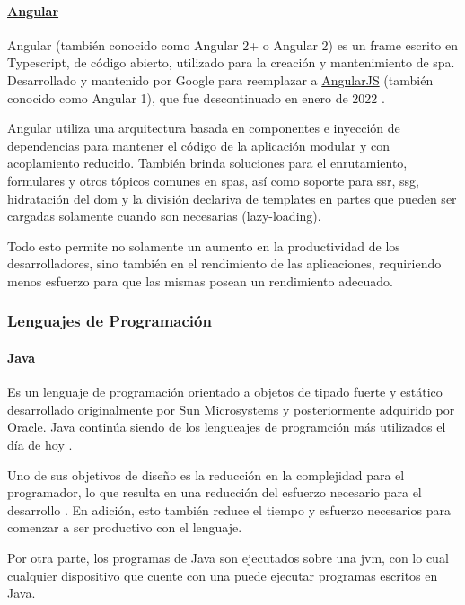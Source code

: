 \paragraph{\href{https://angular.dev/}{Angular}}
Angular (también conocido como Angular 2+ o Angular 2) es un frame escrito en Typescript, de código abierto, utilizado para la creación y mantenimiento de \acrfull{spa}. Desarrollado y mantenido por Google para reemplazar a \href{https://angularjs.org/}{AngularJS} (también conocido como Angular 1), que fue descontinuado en enero de 2022 \cite{angularJSDiscontinued}.

Angular utiliza una arquitectura basada en componentes e inyección de dependencias para mantener el código de la aplicación modular y con acoplamiento reducido. También brinda soluciones para el enrutamiento, formulares y otros tópicos comunes en \acrshort{spa}s, así como soporte para \acrfull{ssr}, \acrfull{ssg}, hidratación del \acrshort{dom} y la división declariva de templates en partes que pueden ser cargadas solamente cuando son necesarias (lazy-loading).

Todo esto permite no solamente un aumento en la productividad de los desarrolladores, sino también en el rendimiento de las aplicaciones, requiriendo menos esfuerzo para que las mismas posean un rendimiento adecuado.

\subsubsection{Lenguajes de Programación}
\paragraph{\href{https://www.java.com/es/}{Java}}
Es un lenguaje de programación orientado a objetos de tipado fuerte y estático desarrollado originalmente por Sun Microsystems y posteriormente adquirido por Oracle. Java continúa siendo de los lengueajes de programción más utilizados el día de hoy \cite{devSurvey2024}.

Uno de sus objetivos de diseño es la reducción en la complejidad para el programador, lo que resulta en una reducción del esfuerzo necesario para el desarrollo \cite{eckelJava}. En adición, esto también reduce el tiempo y esfuerzo necesarios para comenzar a ser productivo con el lenguaje.

Por otra parte, los programas de Java son ejecutados sobre una \acrfull{jvm}, con lo cual cualquier dispositivo que cuente con una puede ejecutar programas escritos en Java.

